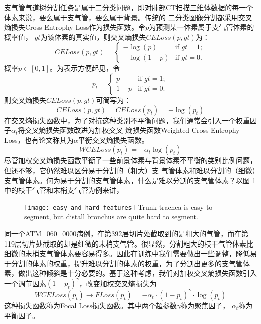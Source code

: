 支气管气道树分割任务是属于二分类问题，即对肺部CT扫描三维体数据的每一个体素来说，要么属于支气管，要么属于背景。传统的
二分类图像分割都采用交叉熵损失Cross Entrophy Loss作为损失函数。令$p$为预测某一体素属于支气管体素的概率值，
$\mathit{gt}$为该体素的真实值，则交叉熵损失$\mathit{CELoss}(p, \mathit{gt})$为：
\begin{equation}
	\mathit{CELoss}(p, \mathit{gt}) = \begin{cases}
		-\log{\left(p\right)} & \text{if } \mathit{gt} = 1; \\
		-\log{\left(1 - p\right)} & \text{if } \mathit{gt} = 0. 
	\end{cases}
\end{equation}
概率$p \in [0, 1]$。为表示方便起见，令
\begin{equation}
	p_t = \begin{cases}
		p & \text{if } \mathit{gt} = 1; \\
		1 - p & \text{if } \mathit{gt} = 0.
	\end{cases}
\end{equation}
则交叉熵损失$\mathit{CELoss}(p, gt)$可简写为：
\begin{equation}
	\mathit{CELoss}(p, \mathit{gt}) = \mathit{CELoss}(p_t) = -\log{\left(p_t\right)}
\end{equation}
在交叉熵损失函数中，为了对抗这种类别不平衡问题，我们通常会引入一个权重因子$\alpha_t$将交叉熵损失函数改进为加权交叉
熵损失函数Weighted Cross Entrophy Loss，也有论文称其为$\alpha$平衡交叉熵损失函数。
\begin{equation}
	\mathit{WCELoss}(p_t) = -\alpha_t \log{\left(p_t\right)}
\end{equation}
尽管加权交叉熵损失函数平衡了一些前景体素与背景体素不平衡的类别比例问题，但还不够，它仍然难以区分易于分割的（粗大）支
气管体素和难以分割的（细微）支气管体素。何为易于分割的支气管体素，什么是难以分割的支气管体素？以图
\ref{fig:easy_hard_bronchus}中的枝干气管和末梢支气管为例来讲，
\begin{figure}[!ht]
	\centering
	\texttt{[image: easy\_and\_hard\_features]}
		{Trunk trachea is easy to segment, but distall bronchus are quite hard to segment.}
	\label{fig:easy_hard_bronchus}
\end{figure}
同一个ATM\_060\_0000病例，在第392层切片处截取到的是粗大的气管，而在第119层切片处截取的却是细微的末梢支气管。很显然，分割粗大的枝干气管体素比细微的末梢支气管体素要容易得多。因此在训练中我们需要做出一些调整，降低易于分割的体素的权重，提升难以分割的体素的权重，为了分割出更多的支气管体素，做出这种倾斜是十分必要的。基于这种考虑，我们对加权交叉熵损失函数引入一个调节因素$(1 - p_t)^{\gamma}$，改变加权交叉熵损失为
\begin{equation}
	\mathit{WCELoss}\left(p_t\right) \longrightarrow \mathit{FLoss}\left(p_t\right) = - \alpha_{t} \cdot \left(1 - p_t\right)^{\gamma} \cdot \log{\left(p_t\right)}
\end{equation}
这种损失函数称为Focal Loss损失函数。其中两个超参数$\gamma$称为聚焦因子，
$\alpha_{t}$称为平衡因子。

